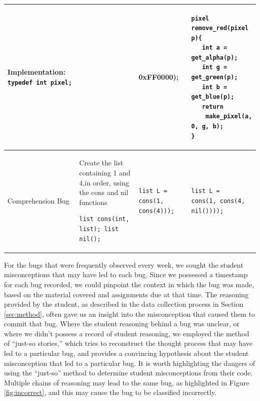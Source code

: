 \documentclass{sig-alternate}
\begin{document}
\begin{table}
\begin{tabular}{|p{0.9in}|p{2.1in}|p{1.7in}|p{1.7in}|}
\textbf{Implementation:} \verb|typedef int pixel;|
\vspace{0.1in}
&
\vspace{-0.2in}
\begin{verbatim}
pixel remove_red(pixel p){
   return (p & 0xFF0000);
}
\end{verbatim}
&
\vspace{-0.2in}
\begin{verbatim}
pixel remove_red(pixel p){
   int a = get_alpha(p);
   int g = get_green(p);
   int b = get_blue(p);
   return
    make_pixel(a, 0, g, b);
}
\end{verbatim}\\
\hline
Comprehension Bug &
Create the list containing 1 and 4,in order, using the cons and nil functions
\begin{verbatim}
list cons(int, list); list nil();
\end{verbatim}
&
\vspace{-0.2in}
\begin{verbatim}
list L = cons(1, cons(4)));
\end{verbatim}
\vspace{-0.2in}
&
\vspace{-0.2in}
\begin{verbatim}
list L =
cons(1, cons(4, nil())));
\end{verbatim}
\vspace{-0.2in}
\\ \hline
\end{tabular}
\end{table}


For the bugs that were frequently observed every week, we sought the
student misconceptions that may have led to each bug. Since we
possessed a timestamp for each bug recorded, we could pinpoint the
context in which the bug was made, based on the material covered and
assignments due at that time. The reasoning provided by the
student, as described in the data collection process in Section
\ref{sec:method}, often gave us an insight into the misconception that
caused them to commit that bug. Where the student reasoning behind a
bug was unclear, or where we didn't possess a record of student
reasoning, we employed the method of ``just-so stories,''
\cite{JoniSolowayGoldmanEhrlich83} which tries to reconstruct the
thought process that may have led to a particular bug, and provides a
convincing hypothesis about the student misconception that led to a
particular bug. It is worth highlighting the dangers of using the
``just-so'' method to determine student misconceptions from their
code. Multiple chains of reasoning may lead to the same bug, as
highlighted in Figure \ref{fig:incorrect}, and this may cause the bug
to be classified incorrectly.\\
\end{document}
